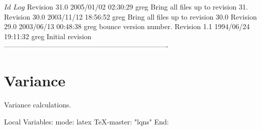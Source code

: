 \C 
\C $Id$
\C 
\C $Log$
\C Revision 31.0  2005/01/02 02:30:29  greg
\C Bring all files up to revision 31.
\C
\C Revision 30.0  2003/11/12 18:56:52  greg
\C Bring all files up to revision 30.0
\C
\C Revision 29.0  2003/06/13 00:48:38  greg
\C bounce version number.
\C
\C Revision 1.1  1994/06/24 19:11:32  greg
\C Initial revision
\C
\C
\C ----------------------------------------------------------------------
\section{Variance}

Variance calculations.

\C Local Variables: 
\C mode: latex
\C TeX-master: "lqns"
\C End: 
